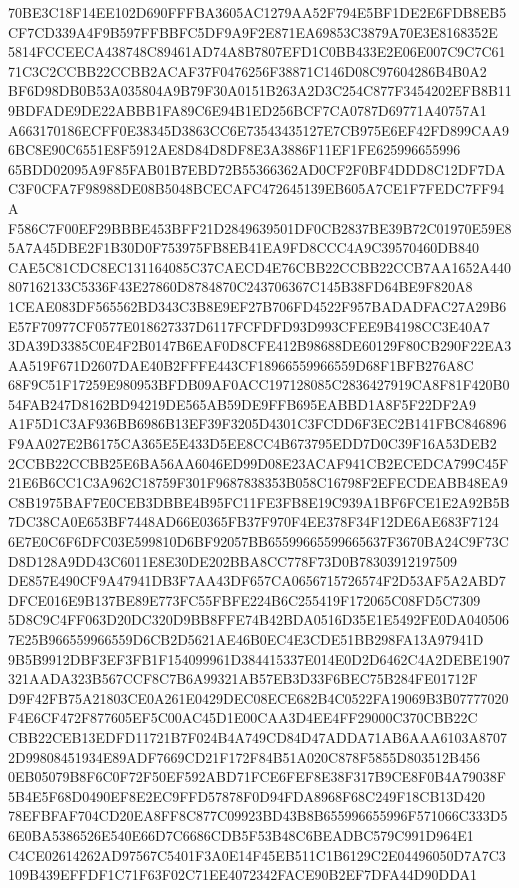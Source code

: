\documentclass[UTF8,fontset=fandol,zihao=-4,a4paper]{ctexart}
\begin{document}
{{70BE3C18F14EE102D690FFFBA3605AC1279AA52F794E5BF1DE2E6FDB8EB5CF7CD339A4F9B597FFBBFC5DF9A9F2E871EA69853C3879A70E3E8168352E
5814FCCEECA438748C89461AD74A8B7807EFD1C0BB433E2E06E007C9C7C6171C3C2CCBB22CCBB2ACAF37F0476256F38871C146D08C97604286B4B0A2
BF6D98DB0B53A035804A9B79F30A0151B263A2D3C254C877F3454202EFB8B119BDFADE9DE22ABBB1FA89C6E94B1ED256BCF7CA0787D69771A40757A1
A663170186ECFF0E38345D3863CC6E73543435127E7CB975E6EF42FD899CAA96BC8E90C6551E8F5912AE8D84D8DF8E3A3886F11EF1FE625996655996
65BDD02095A9F85FAB01B7EBD72B55366362AD0CF2F0BF4DDD8C12DF7DAC3F0CFA7F98988DE08B5048BCECAFC472645139EB605A7CE1F7FEDC7FF94A
F586C7F00EF29BBBE453BFF21D2849639501DF0CB2837BE39B72C01970E59E85A7A45DBE2F1B30D0F753975FB8EB41EA9FD8CCC4A9C39570460DB840
CAE5C81CDC8EC131164085C37CAECD4E76CBB22CCBB22CCB7AA1652A440807162133C5336F43E27860D8784870C243706367C145B38FD64BE9F820A8
1CEAE083DF565562BD343C3B8E9EF27B706FD4522F957BADADFAC27A29B6E57F70977CF0577E018627337D6117FCFDFD93D993CFEE9B4198CC3E40A7
3DA39D3385C0E4F2B0147B6EAF0D8CFE412B98688DE60129F80CB290F22EA3AA519F671D2607DAE40B2FFFE443CF18966559966559D68F1BFB276A8C
68F9C51F17259E980953BFDB09AF0ACC197128085C2836427919CA8F81F420B054FAB247D8162BD94219DE565AB59DE9FFB695EABBD1A8F5F22DF2A9
A1F5D1C3AF936BB6986B13EF39F3205D4301C3FCDD6F3EC2B141FBC846896F9AA027E2B6175CA365E5E433D5EE8CC4B673795EDD7D0C39F16A53DEB2
2CCBB22CCBB25E6BA56AA6046ED99D08E23ACAF941CB2ECEDCA799C45F21E6B6CC1C3A962C18759F301F9687838353B058C16798F2EFECDEABB48EA9
C8B1975BAF7E0CEB3DBBE4B95FC11FE3FB8E19C939A1BF6FCE1E2A92B5B7DC38CA0E653BF7448AD66E0365FB37F970F4EE378F34F12DE6AE683F7124
6E7E0C6F6DFC03E599810D6BF92057BB65599665599665637F3670BA24C9F73CD8D128A9DD43C6011E8E30DE202BBA8CC778F73D0B78303912197509
DE857E490CF9A47941DB3F7AA43DF657CA0656715726574F2D53AF5A2ABD7DFCE016E9B137BE89E773FC55FBFE224B6C255419F172065C08FD5C7309
5D8C9C4FF063D20DC320D9BB8FFE74B42BDA0516D35E1E5492FE0DA0405067E25B966559966559D6CB2D5621AE46B0EC4E3CDE51BB298FA13A97941D
9B5B9912DBF3EF3FB1F154099961D384415337E014E0D2D6462C4A2DEBE1907321AADA323B567CCF8C7B6A99321AB57EB3D33F6BEC75B284FE01712F
D9F42FB75A21803CE0A261E0429DEC08ECE682B4C0522FA19069B3B07777020F4E6CF472F877605EF5C00AC45D1E00CAA3D4EE4FF29000C370CBB22C
CBB22CEB13EDFD11721B7F024B4A749CD84D47ADDA71AB6AAA6103A87072D99808451934E89ADF7669CD21F172F84B51A020C878F5855D803512B456
0EB05079B8F6C0F72F50EF592ABD71FCE6FEF8E38F317B9CE8F0B4A79038F5B4E5F68D0490EF8E2EC9FFD57878F0D94FDA8968F68C249F18CB13D420
78EFBFAF704CD20EA8FF8C877C09923BD43B8B655996655996F571066C333D56E0BA5386526E540E66D7C6686CDB5F53B48C6BEADBC579C991D964E1
C4CE02614262AD97567C5401F3A0E14F45EB511C1B6129C2E04496050D7A7C3109B439EFFDF1C71F63F02C71EE4072342FACE90B2EF7DFA44D90DDA1
}}
\end{document}
